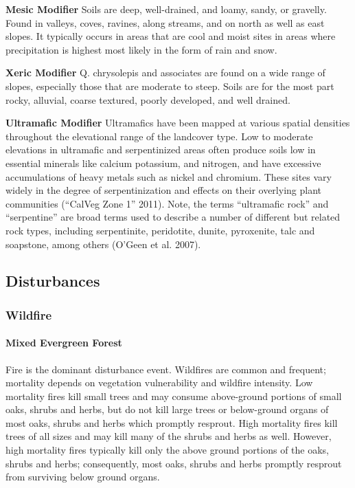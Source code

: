 \begin{adjustwidth}{2cm}{}
\textbf{Mesic Modifier }
Soils are deep, well-drained, and loamy, sandy, or gravelly. Found in valleys, coves, ravines, along streams, and on north as well as east slopes. It typically occurs in areas that are cool and moist sites in areas where precipitation is highest most likely in the form of rain and snow.

\medskip
\noindent \textbf{Xeric Modifier}
Q. chrysolepis and associates are found on a wide range of slopes, especially those that are moderate to steep. Soils are for the most part rocky, alluvial, coarse textured, poorly developed, and well drained. 

\medskip
\noindent \textbf{Ultramafic Modifier} Ultramafics have been mapped at various spatial densities throughout the elevational range of the landcover type. Low to moderate elevations in ultramafic and serpentinized areas often produce soils low in essential minerals like calcium potassium, and nitrogen, and have excessive accumulations of heavy metals such as nickel and chromium. These sites vary widely in the degree of serpentinization and effects on their overlying plant communities (``CalVeg Zone 1'' 2011). Note, the terms ``ultramafic rock'' and ``serpentine'' are broad terms used to describe a number of different but related rock types, including serpentinite, peridotite, dunite, pyroxenite, talc and soapstone, among others (O'Geen et al. 2007). 

\end{adjustwidth}


\subsection*{Disturbances}
\subsubsection{Wildfire}

\paragraph{Mixed Evergreen Forest}		Fire is the dominant disturbance event. Wildfires are common and frequent; mortality depends on vegetation vulnerability and wildfire intensity. Low mortality fires kill small trees and may consume above-ground portions of small oaks, shrubs and herbs, but do not kill large trees or below-ground organs of most oaks, shrubs and herbs which promptly resprout. High mortality fires kill trees of all sizes and may kill many of the shrubs and herbs as well. However, high mortality fires typically kill only the above ground portions of the oaks, shrubs and herbs; consequently, most oaks, shrubs and herbs promptly resprout from surviving below ground organs.

